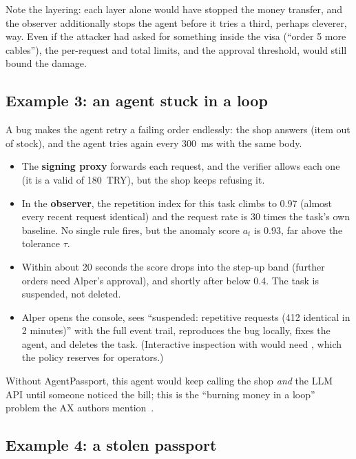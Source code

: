 Note the layering: each layer alone would have stopped the money transfer, and the observer additionally stops the agent before it tries a third, perhaps cleverer, way. Even if the attacker had asked for something inside the visa (``order 5 more cables''), the per-request and total limits, and the approval threshold, would still bound the damage.

\subsection{Example 3: an agent stuck in a loop}\label{sec:ex-loop}

A bug makes the agent retry a failing order endlessly: the shop answers  (item out of stock), and the agent tries again every 300~ms with the same body.

\begin{itemize}
  \item The \textbf{signing proxy} forwards each request, and the verifier allows each one (it is a valid  of 180~TRY), but the shop keeps refusing it.
  \item In the \textbf{observer}, the repetition index for this task climbs to 0.97 (almost every recent request identical) and the request rate is 30 times the task's own baseline. No single rule fires, but the anomaly score $a_t$ is 0.93, far above the tolerance $\tau$.
  \item Within about 20 seconds the score drops into the step-up band (further orders need Alper's approval), and shortly after below 0.4. The task is suspended, not deleted.
  \item Alper opens the console, sees ``suspended: repetitive requests (412 identical  in 2 minutes)'' with the full event trail, reproduces the bug locally, fixes the agent, and deletes the task. (Interactive inspection with  would need , which the policy reserves for operators.)
\end{itemize}

Without AgentPassport, this agent would keep calling the shop \emph{and} the LLM API until someone noticed the bill; this is the ``burning money in a loop'' problem the AX authors mention~\cite{ax}.

\subsection{Example 4: a stolen passport}\label{sec:ex-replay}

